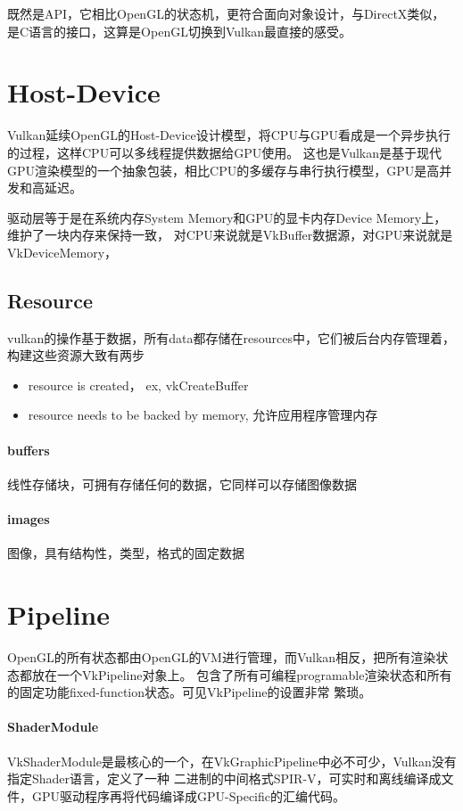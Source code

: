 既然是API，它相比OpenGL的状态机，更符合面向对象设计，与DirectX类似，是C语言的接口，这算是OpenGL切换到Vulkan最直接的感受。

\section{Host-Device}
Vulkan延续OpenGL的Host-Device设计模型，将CPU与GPU看成是一个异步执行的过程，这样CPU可以多线程提供数据给GPU使用。
这也是Vulkan是基于现代GPU渲染模型的一个抽象包装，相比CPU的多缓存与串行执行模型，GPU是高并发和高延迟。

驱动层等于是在系统内存System Memory和GPU的显卡内存Device Memory上，维护了一块内存来保持一致，
对CPU来说就是VkBuffer数据源，对GPU来说就是VkDeviceMemory，

\subsection{Resource}

vulkan的操作基于数据，所有data都存储在resources中，它们被后台内存管理着，构建这些资源大致有两步
\begin{itemize}
    \item {resource is created， ex, vkCreateBuffer}
    \item {resource needs to be backed by memory, 允许应用程序管理内存}
\end{itemize}

\paragraph{buffers}

线性存储块，可拥有存储任何的数据，它同样可以存储图像数据

\paragraph{images}

图像，具有结构性，类型，格式的固定数据


\section{Pipeline}
OpenGL的所有状态都由OpenGL的VM进行管理，而Vulkan相反，把所有渲染状态都放在一个VkPipeline对象上。
包含了所有可编程programable渲染状态和所有的固定功能fixed-function状态。可见VkPipeline的设置非常
繁琐。

\paragraph{ShaderModule}
VkShaderModule是最核心的一个，在VkGraphicPipeline中必不可少，Vulkan没有指定Shader语言，定义了一种
二进制的中间格式SPIR-V，可实时和离线编译成文件，GPU驱动程序再将代码编译成GPU-Specific的汇编代码。

